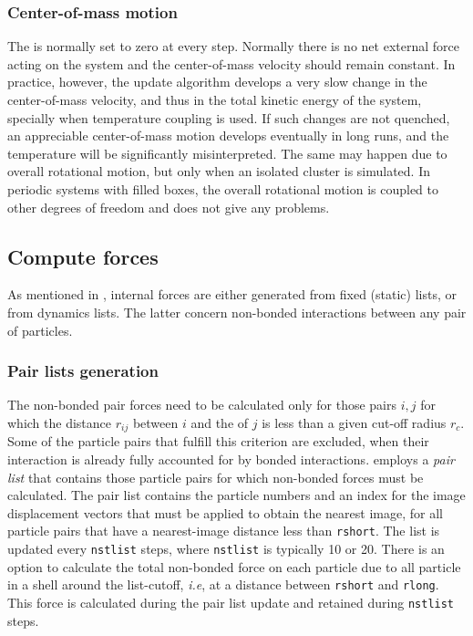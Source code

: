 \subsubsection*{Center-of-mass motion}
The  is normally set to zero at
every step.  Normally there is no net external force acting on the
system and the center-of-mass velocity should remain constant. In
practice, however, the update algorithm develops a very slow change in
the center-of-mass velocity, and thus in the total kinetic energy of
the system, specially when temperature coupling is used. If such
changes are not quenched, an appreciable center-of-mass motion
develops eventually in long runs, and the temperature will be
significantly misinterpreted. The same may happen due to overall
rotational motion, but only when an isolated cluster is simulated. In
periodic systems with filled boxes, the overall rotational motion is
coupled to other degrees of freedom and does not give any problems.

\subsection{Compute forces}
\label{subsec:forces}
As mentioned in , internal forces are
either generated from fixed (static) lists, or from dynamics lists.
The latter concern non-bonded interactions between any pair of particles.

\subsubsection{Pair lists generation}
The non-bonded pair forces need to be calculated only for those pairs
$i,j$  for which the distance $r_{ij}$ between $i$ and the 
of  $j$ is less than a given cut-off radius $r_c$. Some of the
particle pairs that fulfill this criterion are excluded, when their
interaction is already fully accounted for by bonded interactions. {\gromacs}
employs  a {\em pair list} that contains 
those  particle pairs for which non-bonded forces must be calculated.
The  pair list contains the particle numbers and an index for the image
displacement vectors that must be applied to  obtain the nearest
image, for  all particle pairs that
have a  nearest-image distance less than \verb'rshort'. The list is
updated  every \verb'nstlist' steps, where \verb'nstlist' is typically
10 or  20. There is an option to calculate the total non-bonded force
on each  particle due to all particle in a shell around the
list-cutoff, {\em  i.e}, at a distance between \verb'rshort' and
\verb'rlong'.  This force is calculated during the pair list update
and  retained during \verb'nstlist' steps.

